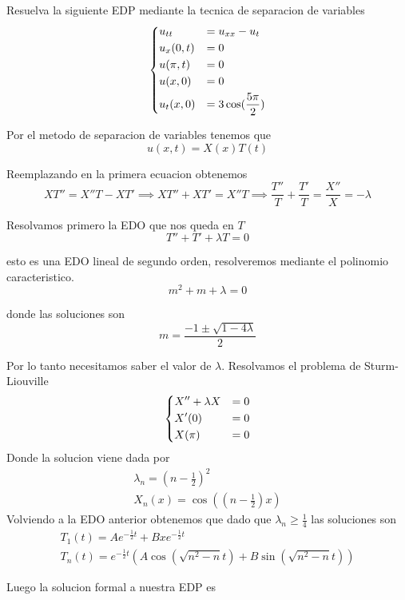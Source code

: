 \documentclass[../main.tex]{subfiles}
\begin{document}
\begin{problem}
  Resuelva la siguiente EDP mediante la tecnica de separacion de variables
  \begin{equation*}
  \begin{dcases}
    u_{tt} &= u_{xx} - u_t\\
    u_x(0, t) &= 0\\
    u(\pi, t) &= 0\\
    u(x, 0) &= 0\\
    u_t(x, 0) &= 3 \cos(\frac{5\pi}{2})
  \end{dcases}
  \end{equation*}
\end{problem}
\begin{solution}
  Por el metodo de separacion de variables tenemos que
  \begin{equation*}
    u(x, t) = X(x)T(t)
  \end{equation*}

  Reemplazando en la primera ecuacion obtenemos
  \begin{equation*}
    XT'' = X''T - XT' \implies XT'' + XT' = X''T \implies \frac{T''}{T} + \frac{T'}{T} = \frac{X''}{X} = -\lambda
  \end{equation*}

  Resolvamos primero la EDO que nos queda en $T$
  \begin{equation*}
    T'' + T' + \lambda T = 0
  \end{equation*}

  esto es una EDO lineal de segundo orden, resolveremos mediante el polinomio caracteristico.
  \begin{equation*}
    m^{2} + m + \lambda = 0
  \end{equation*}

  donde las soluciones son
  \begin{equation*}
    m = \frac{-1 \pm \sqrt{1 - 4\lambda}}{2}
  \end{equation*}

  Por lo tanto necesitamos saber el valor de $\lambda$. Resolvamos el problema de Sturm-Liouville
  \begin{equation*}
    \begin{dcases}
      X'' + \lambda X &= 0\\
      X'(0) &= 0\\
      X(\pi) &= 0
    \end{dcases}
  \end{equation*}
  Donde la solucion viene dada por
  \begin{gather*}
    \lambda_{n} = (n - \frac12)^{2}\\
    X_{n}(x) = \cos((n - \frac12)x)
  \end{gather*}
  Volviendo a la EDO anterior obtenemos que dado que $\lambda_{n} \geq \frac{1}{4}$ las soluciones son
  \begin{gather*}
    T_{1}(t) = Ae^{-\frac12 t} + Bxe^{-\frac12 t}\\
    T_{n}(t) = e^{-\frac12 t}(A \cos(\sqrt{n^{2} - n} t) + B \sin(\sqrt{n^{2} - n}t))
  \end{gather*}

  Luego la solucion formal a nuestra EDP es
\end{solution}
\end{document}
